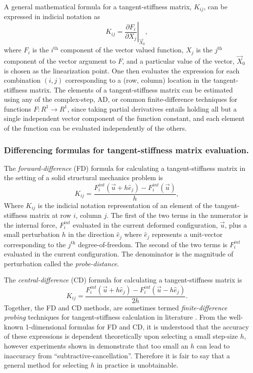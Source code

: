 \documentclass[preprint,12pt]{elsarticle}
\begin{document}
A general mathematical formula for a tangent-stiffness matrix, $K_{ij}$, can be
expressed in indicial notation as 
%
\begin{equation} K_{ij} = \left. \frac{\partial F_i}{\partial
X_j}\right|_{\vec{X}_0}, \end{equation}
%
where $F_i$ is the $i^{\mbox{th}}$ component of the vector valued function,
$X_j$ is the $j^{\mbox{th}}$ component of the vector argument to $F$, and a
particular value of the vector, $\vec{X}_0$ is chosen as the linearization
point. One then evaluates the expression for each combination $(i, j)$
corresponding to a (row, column) location in the tangent-stiffness matrix. The
elements of a tangent-stiffness matrix can be estimated using any of the
complex-step, AD, or common finite-difference techniques for functions $F:R^1
\rightarrow R^1$, since taking partial derivatives entails holding all but a
single independent vector component of the function constant, and each element
of the function can be evaluated independently of the others. \\ 

\subsubsection{Differencing formulas for tangent-stiffness matrix evaluation.}

The \emph{forward-difference} (FD) formula for calculating a tangent-stiffness matrix in the setting of a solid structural mechanics problem is 
%
\begin{equation} 
  K_{ij} = \frac{F_i^{int}(\vec{u} + h \hat{e}_j) - F_i^{int}(\vec{u})}{h},
\end{equation}
%
Where $K_{ij}$ is the indicial notation representation of an element of the tangent-stiffness matrix at row $i$, column $j$. The first of the two terms in the numerator is the internal force, $F_i^{int}$ evaluated in the current deformed configuration, $\vec{u}$,  plus a small perturbation $h$ in the direction $\hat{e}_j$ where $\hat{e}_j$ represents a unit-vector corresponding to the $j^{\mbox{th}}$ degree-of-freedom. The second of the two terms is $F_i^{int}$ evaluated in the current configuration. The denominator is the magnitude of perturbation called the \emph{probe-distance}.

The \emph{central-difference} (CD) formula for calculating a tangent-stiffness matrix is
%
\begin{equation} 
  K_{ij} = \frac{F_i^{int}(\vec{u} + h \hat{e}_j) - F_i^{int}(\vec{u} - h \hat{e}_j)}{2 h}.
\end{equation}
%
Together, the FD and CD methods, are sometimes termed \emph{finite-difference probing} techniques for tangent-stiffness calculation in literature \cite{ref-Adaggio}. From the well-known 1-dimensional formulas for FD and CD, it is understood that the accuracy of these expressions is dependent theoretically upon selecting a small step-size $h$, however experiments shown in \cite{squire1998using} demonstrate that too small an $h$ can lead to inaccuracy from ``subtractive-cancellation''. Therefore it is fair to say that a general method for selecting $h$ in practice is unobtainable.
\end{document}
